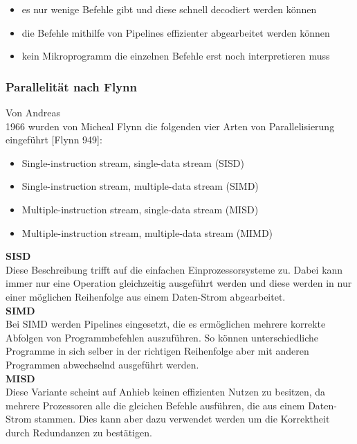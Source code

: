\documentclass[12pt]{article}
\begin{document}
\begin{itemize}
\item es nur wenige Befehle gibt und diese schnell decodiert werden können
\item die Befehle mithilfe von Pipelines effizienter abgearbeitet werden können
\item kein Mikroprogramm die einzelnen Befehle erst noch interpretieren muss
\end{itemize}
 

\subsubsection{Parallelität nach Flynn}
Von Andreas\\
1966 wurden von Micheal Flynn die folgenden vier Arten von Parallelisierung eingeführt [Flynn 949]:

\begin{itemize}
\item Single-instruction stream, single-data stream (SISD)
\item Single-instruction stream, multiple-data stream (SIMD)
\item Multiple-instruction stream, single-data stream (MISD)
\item Multiple-instruction stream, multiple-data stream (MIMD)
\end{itemize}

\noindent
\textbf{SISD}\\
Diese Beschreibung trifft auf die einfachen Einprozessorsysteme zu. Dabei kann immer nur eine Operation gleichzeitig ausgeführt werden und diese werden in nur einer möglichen Reihenfolge aus einem Daten-Strom abgearbeitet.\\

\noindent
\textbf{SIMD}\\
Bei SIMD werden Pipelines eingesetzt, die es ermöglichen mehrere korrekte Abfolgen von Programmbefehlen auszuführen. So können unterschiedliche Programme in sich selber in der richtigen Reihenfolge aber mit anderen Programmen abwechselnd ausgeführt werden.\\

\noindent
\textbf{MISD}\\
Diese Variante scheint auf Anhieb keinen effizienten Nutzen zu besitzen, da mehrere Prozessoren alle die gleichen Befehle ausführen, die aus einem Daten-Strom stammen. Dies kann aber dazu verwendet werden um die Korrektheit durch Redundanzen zu bestätigen. \\
\end{document}
